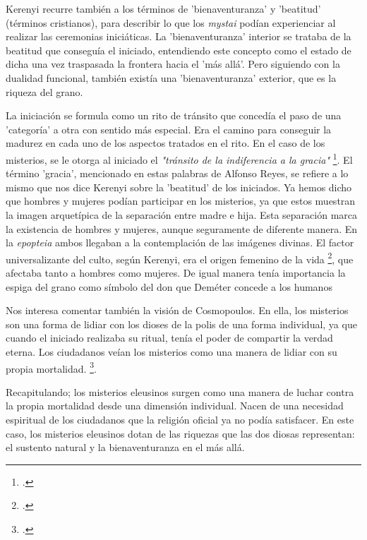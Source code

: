 Kerenyi recurre también a los términos de 'bienaventuranza' y 'beatitud' (términos cristianos), para describir lo que los \textit{mystai} podían experienciar al realizar las ceremonias iniciáticas. La 'bienaventuranza' interior se trataba de la beatitud que conseguía el iniciado, entendiendo este concepto como el estado de dicha una vez traspasada la frontera hacia el 'más allá'. Pero siguiendo con la dualidad funcional, también existía una 'bienaventuranza' exterior, que es la riqueza del grano.

La iniciación se formula como un rito de tránsito que concedía el paso de una 'categoría' a otra con sentido más especial. Era el camino para conseguir la madurez en cada uno de los aspectos tratados en el rito. En el caso de los misterios, se le otorga al iniciado el \textit{"tránsito de la indiferencia a la gracia"} \footcite[156]{reyesReligionGriega2018}. El término 'gracia', mencionado en estas palabras de Alfonso Reyes, se refiere a lo mismo que nos dice Kerenyi sobre la 'beatitud' de los iniciados. 
Ya hemos dicho que hombres y mujeres podían participar en los misterios, ya que estos muestran la imagen arquetípica de la separación entre madre e hija. Esta separación marca la existencia de hombres y mujeres, aunque seguramente de diferente manera. En la \textit{epopteia} ambos llegaban a la contemplación de las imágenes divinas. El factor universalizante del culto, según Kerenyi, era el origen femenino de la vida \footcite[158]{kerenyiEleusisImagenArquetipica2004}, que afectaba tanto a hombres como mujeres. De igual manera tenía importancia la espiga del grano como símbolo del don que Deméter concede a los humanos 

Nos interesa comentar también la visión de Cosmopoulos. En ella, los misterios son una forma de lidiar con los dioses de la polis de una forma individual, ya que cuando el iniciado realizaba su ritual, tenía el poder de compartir la verdad eterna. Los ciudadanos veían los misterios como una manera de lidiar con su propia mortalidad. \footcite[]{cosmopoulosGreekMysteriesArchaeology2005}. 

Recapitulando; los misterios eleusinos surgen como una manera de luchar contra la propia mortalidad desde una dimensión individual. Nacen de una necesidad espiritual de los ciudadanos que la religión oficial ya no podía satisfacer. En este caso, los misterios eleusinos dotan de las riquezas que las dos diosas representan: el sustento natural y la bienaventuranza en el más allá. 